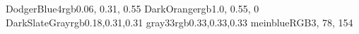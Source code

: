 \providecommand{\definecolor}{}
\definecolor{DodgerBlue4}{rgb}{0.06, 0.31, 0.55}
\definecolor{DarkOrange}{rgb}{1.0, 0.55, 0}
\definecolor{DarkSlateGray}{rgb}{0.18,0.31,0.31}
\definecolor{gray33}{rgb}{0.33,0.33,0.33}
\definecolor{meinblue}{RGB}{3, 78, 154} %